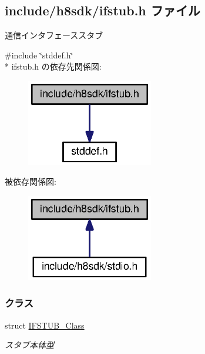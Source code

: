 \subsection{include/h8sdk/ifstub.h ファイル}
\label{ifstub_8h}


通信インタフェーススタブ  


{\ttfamily \#include \char`\"{}stddef.\+h\char`\"{}}\\*
ifstub.\+h の依存先関係図\+:
\nopagebreak
\begin{figure}[H]
\begin{center}
\leavevmode
\includegraphics[width=157pt]{d8/d42/ifstub_8h__incl}
\end{center}
\end{figure}
被依存関係図\+:
\nopagebreak
\begin{figure}[H]
\begin{center}
\leavevmode
\includegraphics[width=157pt]{d8/d36/ifstub_8h__dep__incl}
\end{center}
\end{figure}
\subsubsection*{クラス}
\begin{DoxyCompactItemize}
\item 
struct \hyperlink{ifstub_8h_da/da7/structIFSTUB__Class}{I\+F\+S\+T\+U\+B\+\_\+\+Class}
\begin{DoxyCompactList}\small\item\em スタブ本体型 \end{DoxyCompactList}\end{DoxyCompactItemize}
